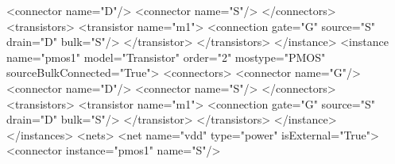 \begin{DoxyCodeInclude}
          <\textcolor{keywordtype}{connector} \textcolor{keyword}{name}=\textcolor{stringliteral}{"D"}/>
          <\textcolor{keywordtype}{connector} \textcolor{keyword}{name}=\textcolor{stringliteral}{"S"}/>
        </\textcolor{keywordtype}{connectors}>
        <\textcolor{keywordtype}{transistors}>
          <\textcolor{keywordtype}{transistor} \textcolor{keyword}{name}=\textcolor{stringliteral}{"m1"}>
            <\textcolor{keywordtype}{connection} \textcolor{keyword}{gate}=\textcolor{stringliteral}{"G"} \textcolor{keyword}{source}=\textcolor{stringliteral}{"S"} \textcolor{keyword}{drain}=\textcolor{stringliteral}{"D"} \textcolor{keyword}{bulk}=\textcolor{stringliteral}{"S"}/>
          </\textcolor{keywordtype}{transistor}>
        </\textcolor{keywordtype}{transistors}>
      </\textcolor{keywordtype}{instance}>
      <\textcolor{keywordtype}{instance} \textcolor{keyword}{name}=\textcolor{stringliteral}{"pmos1"} \textcolor{keyword}{model}=\textcolor{stringliteral}{"Transistor"} \textcolor{keyword}{order}=\textcolor{stringliteral}{"2"} \textcolor{keyword}{mostype}=\textcolor{stringliteral}{"PMOS"} \textcolor{keyword}{sourceBulkConnected}=\textcolor{stringliteral}{"True"}>
        <\textcolor{keywordtype}{connectors}>
          <\textcolor{keywordtype}{connector} \textcolor{keyword}{name}=\textcolor{stringliteral}{"G"}/>
          <\textcolor{keywordtype}{connector} \textcolor{keyword}{name}=\textcolor{stringliteral}{"D"}/>
          <\textcolor{keywordtype}{connector} \textcolor{keyword}{name}=\textcolor{stringliteral}{"S"}/>
        </\textcolor{keywordtype}{connectors}>
        <\textcolor{keywordtype}{transistors}>
          <\textcolor{keywordtype}{transistor} \textcolor{keyword}{name}=\textcolor{stringliteral}{"m1"}>
            <\textcolor{keywordtype}{connection} \textcolor{keyword}{gate}=\textcolor{stringliteral}{"G"} \textcolor{keyword}{source}=\textcolor{stringliteral}{"S"} \textcolor{keyword}{drain}=\textcolor{stringliteral}{"D"} \textcolor{keyword}{bulk}=\textcolor{stringliteral}{"S"}/>
          </\textcolor{keywordtype}{transistor}>
        </\textcolor{keywordtype}{transistors}>
      </\textcolor{keywordtype}{instance}>
    </\textcolor{keywordtype}{instances}>
    <\textcolor{keywordtype}{nets}>
      <\textcolor{keywordtype}{net} \textcolor{keyword}{name}=\textcolor{stringliteral}{"vdd"} \textcolor{keyword}{type}=\textcolor{stringliteral}{"power"} \textcolor{keyword}{isExternal}=\textcolor{stringliteral}{"True"}>
        <\textcolor{keywordtype}{connector} \textcolor{keyword}{instance}=\textcolor{stringliteral}{"pmos1"} \textcolor{keyword}{name}=\textcolor{stringliteral}{"S"}/>

\end{DoxyCodeInclude}
